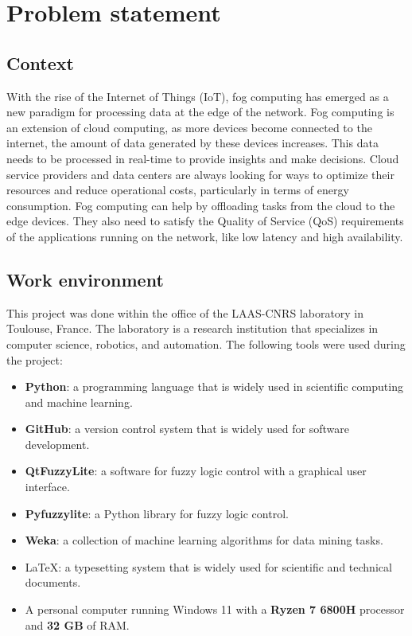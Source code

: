 \chapter{Problem statement}
\label{chap:problem-statement}

\section{Context}
\label{sec:context}

With the rise of the Internet of Things (IoT), fog computing has emerged as a new paradigm for processing data at the edge
of the network. Fog computing is an extension of cloud computing, as more devices become connected to the internet, the
amount of data generated by these devices increases. This data needs to be processed in real-time to provide insights and
make decisions. Cloud service providers and data centers are always looking for ways to optimize their resources and reduce
operational costs, particularly in terms of energy consumption. Fog computing can help by offloading tasks from the cloud to
the edge devices. They also need to satisfy the Quality of Service (QoS) requirements of the applications running on the
network, like low latency and high availability.

\section{Work environment}
\label{sec:work-environment}

This project was done within the office of the LAAS-CNRS laboratory in Toulouse, France. The laboratory is a research
institution that specializes in computer science, robotics, and automation. The following tools were used during the
project:

\begin{itemize}
  \item \textbf{Python}: a programming language that is widely used in scientific computing and machine learning.
  \item \textbf{GitHub}: a version control system that is widely used for software development.
  \item \textbf{QtFuzzyLite}: a software for fuzzy logic control with a graphical user interface.
  \item \textbf{Pyfuzzylite}: a Python library for fuzzy logic control.
  \item \textbf{Weka}: a collection of machine learning algorithms for data mining tasks.
  \item \LaTeX: a typesetting system that is widely used for scientific and technical documents.
  \item A personal computer running Windows 11 with a \textbf{Ryzen 7 6800H} processor and \textbf{32 GB} of RAM.
\end{itemize}

